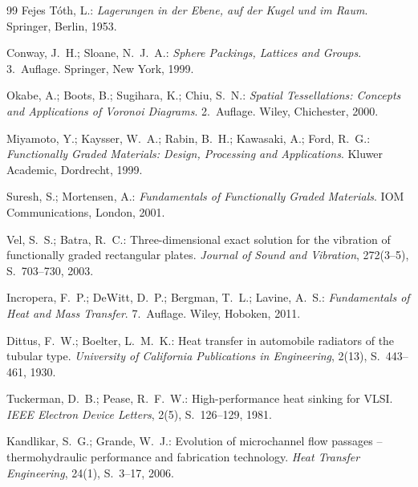 ﻿\documentclass[a4paper,12pt]{article}
\theoremstyle{definition}
\begin{document}
\begin{thebibliography}{99}
Fejes T{\'o}th, L.:
\textit{Lagerungen in der Ebene, auf der Kugel und im Raum}.
Springer, Berlin, 1953.
 
Conway, J.~H.; Sloane, N.~J.~A.:
\textit{Sphere Packings, Lattices and Groups}.
3.~Auflage. Springer, New York, 1999.
 
Okabe, A.; Boots, B.; Sugihara, K.; Chiu, S.~N.:
\textit{Spatial Tessellations: Concepts and Applications of Voronoi Diagrams}.
2.~Auflage. Wiley, Chichester, 2000.
 
 
Miyamoto, Y.; Kaysser, W.~A.; Rabin, B.~H.; Kawasaki, A.; Ford, R.~G.:
\textit{Functionally Graded Materials: Design, Processing and Applications}.
Kluwer Academic, Dordrecht, 1999.
 
Suresh, S.; Mortensen, A.:
\textit{Fundamentals of Functionally Graded Materials}.
IOM Communications, London, 2001.
 
Vel, S.~S.; Batra, R.~C.:
Three-dimensional exact solution for the vibration of functionally graded
rectangular plates.
\textit{Journal of Sound and Vibration}, 272(3--5), S.~703--730, 2003.
 
 
Incropera, F.~P.; DeWitt, D.~P.; Bergman, T.~L.; Lavine, A.~S.:
\textit{Fundamentals of Heat and Mass Transfer}.
7.~Auflage. Wiley, Hoboken, 2011.
 
Dittus, F.~W.; Boelter, L.~M.~K.:
Heat transfer in automobile radiators of the tubular type.
\textit{University of California Publications in Engineering}, 2(13), S.~443--461, 1930.
 
Tuckerman, D.~B.; Pease, R.~F.~W.:
High-performance heat sinking for VLSI.
\textit{IEEE Electron Device Letters}, 2(5), S.~126--129, 1981.
 
Kandlikar, S.~G.; Grande, W.~J.:
Evolution of microchannel flow passages -- thermohydraulic performance and fabrication technology.
\textit{Heat Transfer Engineering}, 24(1), S.~3--17, 2006.
 

\end{thebibliography}
\end{document}
